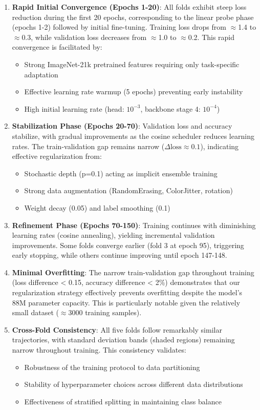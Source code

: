 \documentclass[11pt,a4paper]{article}
\begin{document}
\begin{enumerate}[leftmargin=*]
\item \textbf{Rapid Initial Convergence (Epochs 1-20)}: All folds exhibit steep loss reduction during the first 20 epochs, corresponding to the linear probe phase (epochs 1-2) followed by initial fine-tuning. Training loss drops from \(\approx\)1.4 to \(\approx\)0.3, while validation loss decreases from \(\approx\)1.0 to \(\approx\)0.2. This rapid convergence is facilitated by:
\begin{itemize}
\item Strong ImageNet-21k pretrained features requiring only task-specific adaptation
\item Effective learning rate warmup (5 epochs) preventing early instability
\item High initial learning rate (head: $10^{-3}$, backbone stage 4: $10^{-4}$)
\end{itemize}

\item \textbf{Stabilization Phase (Epochs 20-70)}: Validation loss and accuracy stabilize, with gradual improvements as the cosine scheduler reduces learning rates. The train-validation gap remains narrow (\(\Delta\text{loss} \approx 0.1\)), indicating effective regularization from:
\begin{itemize}
\item Stochastic depth (p=0.1) acting as implicit ensemble training
\item Strong data augmentation (RandomErasing, ColorJitter, rotation)
\item Weight decay (0.05) and label smoothing (0.1)
\end{itemize}

\item \textbf{Refinement Phase (Epochs 70-150)}: Training continues with diminishing learning rates (cosine annealing), yielding incremental validation improvements. Some folds converge earlier (fold 3 at epoch 95), triggering early stopping, while others continue improving until epoch 147-148.

\item \textbf{Minimal Overfitting}: The narrow train-validation gap throughout training (loss difference < 0.15, accuracy difference < 2\%) demonstrates that our regularization strategy effectively prevents overfitting despite the model's 88M parameter capacity. This is particularly notable given the relatively small dataset (\(\approx\)3000 training samples).

\item \textbf{Cross-Fold Consistency}: All five folds follow remarkably similar trajectories, with standard deviation bands (shaded regions) remaining narrow throughout training. This consistency validates:
\begin{itemize}
\item Robustness of the training protocol to data partitioning
\item Stability of hyperparameter choices across different data distributions
\item Effectiveness of stratified splitting in maintaining class balance
\end{itemize}
\end{enumerate}
\end{document}
